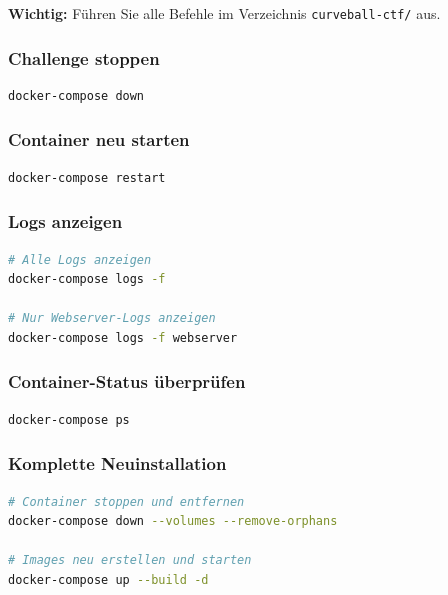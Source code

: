 \documentclass{article}
\begin{document}
\begin{warningbox}
\textbf{Wichtig:} Führen Sie alle Befehle im Verzeichnis \texttt{curveball-ctf/} aus.
\end{warningbox}

\subsubsection{Challenge stoppen}
\begin{lstlisting}[language=bash]
docker-compose down
\end{lstlisting}

\subsubsection{Container neu starten}
\begin{lstlisting}[language=bash]
docker-compose restart
\end{lstlisting}

\subsubsection{Logs anzeigen}
\begin{lstlisting}[language=bash]
# Alle Logs anzeigen
docker-compose logs -f

# Nur Webserver-Logs anzeigen
docker-compose logs -f webserver
\end{lstlisting}

\subsubsection{Container-Status überprüfen}
\begin{lstlisting}[language=bash]
docker-compose ps
\end{lstlisting}

\subsubsection{Komplette Neuinstallation}
\begin{lstlisting}[language=bash]
# Container stoppen und entfernen
docker-compose down --volumes --remove-orphans

# Images neu erstellen und starten
docker-compose up --build -d
\end{lstlisting}

\vspace{0.8cm}
\end{document}
